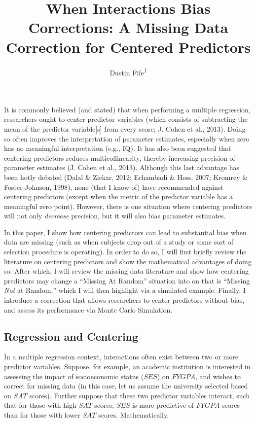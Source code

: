 \documentclass[english,man]{apa6}
\title{When Interactions Bias Corrections: A Missing Data Correction for
Centered Predictors}
\author{Dustin Fife\textsuperscript{1}}
\affiliation{
    \vspace{0.5cm}
          \textsuperscript{1} Rowan University  }
\theoremstyle{definition}
\theoremstyle{definition}
\theoremstyle{remark}
\begin{document}
\maketitle

\setcounter{secnumdepth}{0}



It is commonly believed (and stated) that when performing a multiple
regression, researchers ought to center predictor variables (which
consists of subtracting the mean of the predictor variable{[}s{]} from
every score; J. Cohen et al., 2013). Doing so often improves the
interpretation of parameter estimates, especially when zero has no
meaningful interpretation (e.g., IQ). It has also been suggested that
centering predictors reduces multicollinearity, thereby increasing
precision of parameter estimates (J. Cohen et al., 2013). Although this
last advantage has been hotly debated (Dalal \& Zickar, 2012; Echambadi
\& Hess, 2007; Kromrey \& Foster-Johnson, 1998), none (that I know of)
have recommended against centering predictors (except when the metric of
the predictor variable has a meaningful zero point). However, there is
one situation where centering predictors will not only \emph{decrease}
precision, but it will also bias parameter estimates.

In this paper, I show how centering predictors can lead to substantial
bias when data are missing (such as when subjects drop out of a study or
some sort of selection procedure is operating). In order to do so, I
will first briefly review the literature on centering predictors and
show the mathematical advantages of doing so. After which, I will review
the missing data literature and show how centering predictors may change
a \enquote{Missing At Random} situation into on that is \enquote{Missing
\emph{Not} at Random,} which I will then highlight via a simulated
example. Finally, I introduce a correction that allows researchers to
center predictors without bias, and assess its performance via Monte
Carlo Simulation.

\subsection{Regression and Centering}\label{regression-and-centering}

In a multiple regression context, interactions often exist between two
or more predictor variables. Suppose, for example, an academic
institution is interested in assessing the impact of socioeconomic
status (\(SES\)) on \(FYGPA\), and wishes to correct for missing data
(in this case, let us assume the university selected based on \(SAT\)
scores). Further suppose that these two predictor variables interact,
such that for those with high \(SAT\) scores, \(SES\) is more predictive
of \(FYGPA\) scores than for those with lower \(SAT\) scores.
Mathematically,
\end{document}
